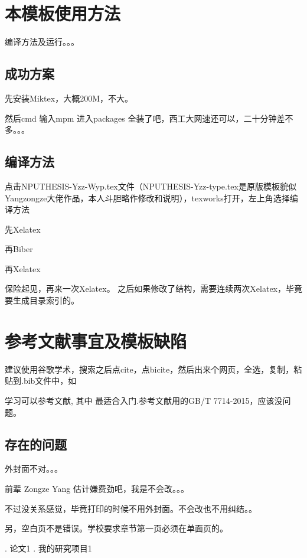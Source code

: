 \documentclass[twoside, workbib, UTF8, phd]{nputhesis}
\begin{document}
\chapter{本模板使用方法}
编译方法及运行。。。
\section{成功方案}
先安装Miktex，大概200M，不大。\par
然后cmd 输入mpm 进入packages 全装了吧，西工大网速还可以，二十分钟差不多。。。
\section{编译方法}
点击NPUTHESIS-Yzz-Wyp.tex文件（NPUTHESIS-Yzz-type.tex是原版模板貌似Yangzongze大佬作品，本人斗胆略作修改和说明），texworks打开，左上角选择编译方法\par
先Xelatex\par\par
再Biber\par\par
再Xelatex\par\par
保险起见，再来一次Xelatex。
之后如果修改了结构，需要连续两次Xelatex，毕竟要生成目录索引的。


\chapter{参考文献事宜及模板缺陷}
建议使用谷歌学术，搜索之后点cite，点bicite，然后出来个网页，全选，复制，粘贴到.bib文件中，如\par
学习可以参考文献\cite{Knuth1986,Lamport1994,Liu2013}, 其中 \cite{Liu2013} 最适合入门.参考文献用的GB/T 7714-2015，应该没问题。
\section{存在的问题}
外封面不对。。。\par
前辈 Zongze Yang 估计嫌费劲吧，我是不会改。。。\par
不过没关系感觉，毕竟打印的时候不用外封面。不会改也不用纠结。。\par\par
另，空白页不是错误。学校要求章节第一页必须在单面页的。

\backmatter
\printbibliography     %
\Appendix  %
\Thanks 
\Work
. 论文1
. 我的研究项目1
\statement
\end{document}
